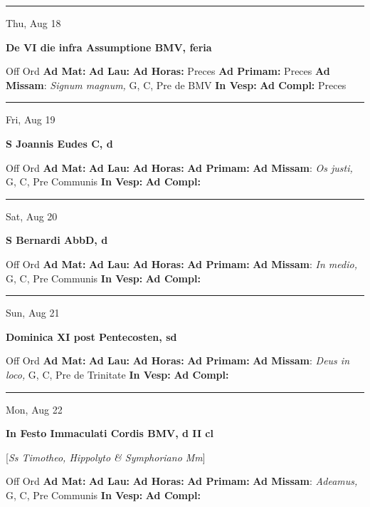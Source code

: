 \documentclass[letterpaper, 10pt]{article}
\begin{document}
\hrule
\begin{center}
Thu, Aug 18
\end{center}\textbf{ \large De VI die infra Assumptione BMV, \textnormal{\normalsize feria}}
\begin{justify}
Off Ord
\textbf{Ad Mat: }
\textbf{Ad Lau: }
\textbf{Ad Horas: }Preces
\textbf{Ad Primam: }Preces
\textbf{Ad Missam}: \textit{Signum magnum,} G, C, Pre de BMV
\textbf{In Vesp: }
\textbf{Ad Compl: }Preces\end{justify}



\hrule
\begin{center}
Fri, Aug 19
\end{center}\textbf{ \large S Joannis Eudes C, \textnormal{\normalsize d}}
\begin{justify}
Off Ord
\textbf{Ad Mat: }
\textbf{Ad Lau: }
\textbf{Ad Horas: }
\textbf{Ad Primam: }
\textbf{Ad Missam}: \textit{Os justi,} G, C, Pre Communis
\textbf{In Vesp: }
\textbf{Ad Compl: }\end{justify}



\hrule
\begin{center}
Sat, Aug 20
\end{center}\textbf{ \large S Bernardi AbbD, \textnormal{\normalsize d}}
\begin{justify}
Off Ord
\textbf{Ad Mat: }
\textbf{Ad Lau: }
\textbf{Ad Horas: }
\textbf{Ad Primam: }
\textbf{Ad Missam}: \textit{In medio,} G, C, Pre Communis
\textbf{In Vesp: }
\textbf{Ad Compl: }\end{justify}



\hrule
\begin{center}
Sun, Aug 21
\end{center}\textbf{ \large Dominica XI post Pentecosten, \textnormal{\normalsize sd}}
\begin{justify}
Off Ord
\textbf{Ad Mat: }
\textbf{Ad Lau: }
\textbf{Ad Horas: }
\textbf{Ad Primam: }
\textbf{Ad Missam}: \textit{Deus in loco,} G, C, Pre de Trinitate
\textbf{In Vesp: }
\textbf{Ad Compl: }\end{justify}



\hrule
\begin{center}
Mon, Aug 22
\end{center}\textbf{ \large In Festo Immaculati Cordis BMV, \textnormal{\normalsize d II cl}}

[\textit{Ss Timotheo, Hippolyto \& Symphoriano Mm}]
\begin{justify}
Off Ord
\textbf{Ad Mat: }
\textbf{Ad Lau: }
\textbf{Ad Horas: }
\textbf{Ad Primam: }
\textbf{Ad Missam}: \textit{Adeamus,} G, C, Pre Communis
\textbf{In Vesp: }
\textbf{Ad Compl: }\end{justify}
\end{document}
